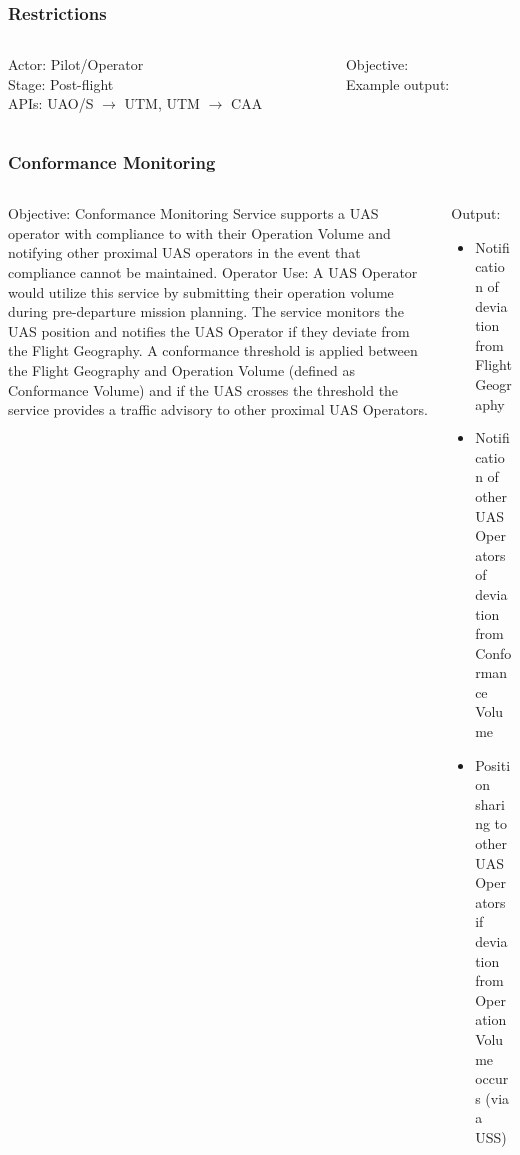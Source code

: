 \documentclass[usenames,dvipsnames,aspectratio=169,serif]{beamer}
\begin{document}
\begin{frame}
   \frametitle{Restrictions}
   \begin{columns}[t]
      \begin{column}{0.5\textwidth}
         Actor: Pilot/Operator \\
         Stage: Post-flight \\
         APIs: UAO/S $\rightarrow$ UTM, UTM $\rightarrow$ CAA \\
      \end{column}
      \begin{column}{0.5\textwidth}
         Objective: \\
         Example output: \\
      \end{column}
   \end{columns}
\end{frame}

\begin{frame}
   \frametitle{Conformance Monitoring}
   \begin{columns}[t]
      \begin{column}{0.5\textwidth}
         Objective: Conformance Monitoring Service supports a UAS operator with compliance to with their Operation Volume and notifying other proximal UAS operators in the event that compliance cannot be maintained.
         Operator Use: A UAS Operator would utilize this service by submitting their operation volume during pre-departure mission planning. The service monitors the UAS position and notifies the UAS Operator if they deviate from the Flight Geography. A conformance threshold is applied between the Flight Geography and Operation Volume (defined as Conformance Volume) and if the UAS crosses the threshold the service provides a traffic advisory to other proximal UAS Operators.
      \end{column}
      \begin{column}{0.5\textwidth}
         Output:
         \begin{itemize}
         \item  Notification of deviation from Flight Geography
         \item  Notification of other UAS Operators of deviation from Conformance Volume
         \item  Position sharing to other UAS Operators if deviation from Operation Volume occurs (via a USS)
         \end{itemize}
      \end{column}
   \end{columns}
\end{frame}
\end{document}

